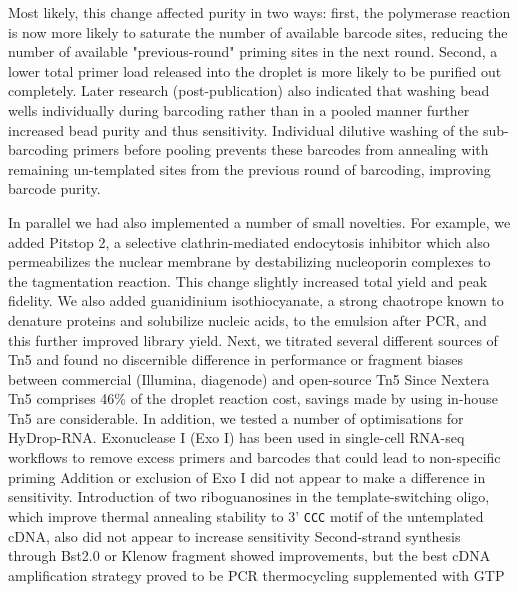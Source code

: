 Most likely, this change affected purity in two ways: first, the polymerase reaction is now more likely to saturate the number of available barcode sites, reducing the number of available "previous-round" priming sites in the next round. Second, a lower total primer load released into the droplet is more likely to be purified out completely. Later research (post-publication) also indicated that washing bead wells individually during barcoding rather than in a pooled manner further increased bead purity and thus sensitivity. Individual dilutive washing of the sub-barcoding primers before pooling prevents these barcodes from annealing with remaining un-templated sites from the previous round of barcoding, improving barcode purity.

In parallel we had also implemented a number of small novelties. For example, we added Pitstop 2, a selective clathrin-mediated endocytosis inhibitor which also permeabilizes the nuclear membrane by destabilizing nucleoporin complexes to the tagmentation reaction. This change slightly increased total yield and peak fidelity. We also added guanidinium isothiocyanate, a strong chaotrope known to denature proteins and solubilize nucleic acids, to the emulsion after PCR, and this further improved library yield. Next, we titrated several different sources of Tn5 and found no discernible difference in performance or fragment biases between commercial (Illumina, diagenode) and open-source Tn5 Since Nextera Tn5 comprises 46\% of the droplet reaction cost, savings made by using in-house Tn5 are considerable. In addition, we tested a number of optimisations for HyDrop-RNA. Exonuclease I (Exo I) has been used in single-cell RNA-seq workflows to remove excess primers and barcodes that could lead to non-specific priming Addition or exclusion of Exo I did not appear to make a difference in sensitivity. Introduction of two riboguanosines in the template-switching oligo, which improve thermal annealing stability to 3' \verb|CCC| motif of the untemplated cDNA, also did not appear to increase sensitivity Second-strand synthesis through Bst2.0 or Klenow fragment showed improvements, but the best cDNA amplification strategy proved to be PCR thermocycling supplemented with GTP

